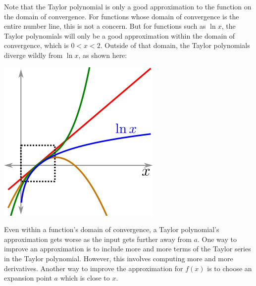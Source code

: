 \documentclass[twoside,openright,titlepage,a4paper]{book}
\begin{document}
\begin{sloppypar}
Note that the Taylor polynomial is only a good approximation to the function on the domain of convergence. For functions whose domain of convergence is the entire number line, this is not a concern. But for functions such as $\ln x$, the Taylor polynomials will only be a good approximation within the domain of convergence, which is $0 < x < 2$. Outside of that domain, the Taylor polynomials diverge wildly from $\ln x$, as shown here:
\begin{center}\includegraphics[scale=0.6]{NaturalLogApproximation}\end{center}

Even within a function's domain of convergence, a Taylor polynomial's approximation gets worse as the input gets further away from $a$. One way to improve an approximation is to include more and more terms of the Taylor series in the Taylor polynomial. However, this involves computing more and more derivatives. Another way to improve the approximation for $f(x)$ is to choose an expansion point $a$ which is close to $x$.


\end{sloppypar}
\end{document}
